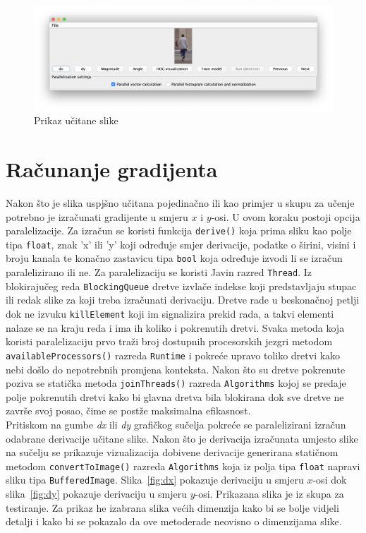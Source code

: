 \documentclass[times, utf8, zavrsni]{fer}
\begin{document}
\begin{figure}[htb]
	\centering
	\includegraphics[width=\linewidth]{figures/loadedImage.png}
	\caption{Prikaz učitane slike}
	\label{fig:loadedImage}
\end{figure}

\section{Računanje gradijenta}
Nakon što je slika uspjšno učitana pojedinačno ili kao primjer u skupu za učenje potrebno je izračunati gradijente u smjeru \(x\) i \(y\)-osi. U ovom koraku postoji opcija paralelizacije. Za izračun se koristi funkcija \verb|derive()| koja prima sliku kao polje tipa \verb|float|, znak 'x' ili 'y' koji određuje smjer derivacije, podatke o širini, visini i broju kanala te konačno zastavicu tipa \verb|bool| koja određuje izvodi li se izračun paralelizirano ili ne. Za paralelizaciju se koristi Javin razred \verb|Thread|. Iz blokirajučeg reda \verb|BlockingQueue| dretve izvlače indekse koji predstavljaju stupac ili redak slike za koji treba izračunati derivaciju. Dretve rade u beskonačnoj petlji dok ne izvuku \verb|killElement| koji im signalizira prekid rada, a takvi elementi nalaze se na kraju reda i ima ih koliko i pokrenutih dretvi. Svaka metoda koja koristi paralelizaciju prvo traži broj dostupnih procesorskih jezgri metodom \verb|availableProcessors()| razreda \verb|Runtime| i pokreće upravo toliko dretvi kako nebi došlo do nepotrebnih promjena konteksta. Nakon što su dretve pokrenute poziva se statička metoda \verb|joinThreads()| razreda \verb|Algorithms| kojoj se predaje polje pokrenutih dretvi kako bi glavna dretva bila blokirana dok sve dretve ne završe svoj posao, čime se postže maksimalna efikasnost. \\

Pritiskom na gumbe \textit{dx} ili \textit{dy} grafičkog sučelja pokreće se paralelizirani izračun odabrane derivacije učitane slike. Nakon što je derivacija izračunata umjesto slike na sučelju se prikazuje vizualizacija dobivene derivacije generirana statičnom metodom \verb|convertToImage()| razreda \verb|Algorithms| koja iz polja tipa \verb|float| napravi sliku tipa \verb|BufferedImage|. Slika~\ref{fig:dx} pokazuje derivaciju u smjeru \(x\)-osi dok slika~\ref{fig:dy} pokazuje derivaciju u smjeru \(y\)-osi. Prikazana slika je iz skupa za testiranje. Za prikaz he izabrana slika većih dimenzija kako bi se bolje vidjeli detalji i kako bi se pokazalo da ove metoderade neovisno o dimenzijama slike.
\end{document}
